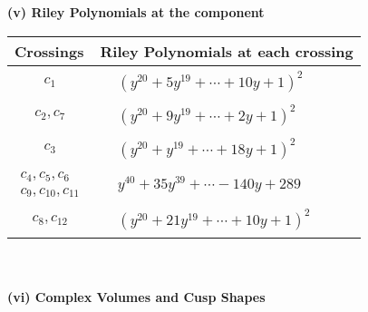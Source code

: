 \documentclass[1p]{elsarticle_modified}
\theoremstyle{definition}
\begin{document}
\newpage\renewcommand{\arraystretch}{1}
\flushleft \textbf{(v) Riley Polynomials at the component}\newline \\
\begin{tabular}{m{50pt}|m{274pt}}
Crossings & \hspace{64pt}Riley Polynomials at each crossing \\
\hline $$\begin{aligned}c_{1}\end{aligned}$$&$\begin{aligned}
&(y^{20}+5 y^{19}+\cdots+10 y+1)^{2}
\end{aligned}$\\
\hline $$\begin{aligned}c_{2},c_{7}\end{aligned}$$&$\begin{aligned}
&(y^{20}+9 y^{19}+\cdots+2 y+1)^{2}
\end{aligned}$\\
\hline $$\begin{aligned}c_{3}\end{aligned}$$&$\begin{aligned}
&(y^{20}+y^{19}+\cdots+18 y+1)^{2}
\end{aligned}$\\
\hline $$\begin{aligned}c_{4},c_{5},c_{6}\\c_{9},c_{10},c_{11}\end{aligned}$$&$\begin{aligned}
&y^{40}+35 y^{39}+\cdots-140 y+289
\end{aligned}$\\
\hline $$\begin{aligned}c_{8},c_{12}\end{aligned}$$&$\begin{aligned}
&(y^{20}+21 y^{19}+\cdots+10 y+1)^{2}
\end{aligned}$\\
\hline
\end{tabular}\\~\\
\newpage\flushleft \textbf{(vi) Complex Volumes and Cusp Shapes}
\end{document}
